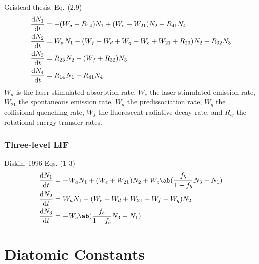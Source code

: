 \documentclass[11pt, twoside, fleqn]{report}
\begin{document}
Gristead thesis, Eq. (2.9)
\begin{align*}
    \odv{N_{1}}{t} & = -(W_{a} + R_{14})N_{1} + (W_{e} + W_{21})N_{2} + R_{41}N_{4}                      \\
    \odv{N_{2}}{t} & = W_{a}N_{1} - (W_{f} + W_{d} + W_{q} + W_{e} + W_{21} + R_{23})N_{2} + R_{32}N_{3} \\
    \odv{N_{3}}{t} & = R_{23}N_{2} - (W_{f} + R_{32})N_{3}                                               \\
    \odv{N_{4}}{t} & = R_{14}N_{1} - R_{41}N_{4}
\end{align*}
$W_{a}$ is the laser-stimulated absorption rate, $W_{e}$ the laser-stimulated emission rate, $W_{21}$ the spontaneous emission rate, $W_{d}$ the predissociation rate, $W_{q}$ the collisional quenching rate, $W_{f}$ the fluorescent radiative decay rate, and $R_{ij}$ the rotational energy transfer rates.

\subsection{Three-level LIF}

Diskin, 1996 Eqs. (1-3)
\begin{align*}
    \odv{N_{1}}{t} & = -W_{a}N_{1} + (W_{e} + W_{21})N_{2} + W_{c}\ab(\frac{f_{b}}{1 - f_{b}}N_{3} - N_{1}) \\
    \odv{N_{2}}{t} & = W_{a}N_{1} - (W_{e} + W_{d} + W_{21} + W_{f} + W_{q})N_{2}                           \\
    \odv{N_{3}}{t} & = -W_{c}\ab(\frac{f_{b}}{1 - f_{b}}N_{3} - N_{1})
\end{align*}

\appendix
\chapter{Diatomic Constants}
\label{a:diatomic_constants}
\end{document}
